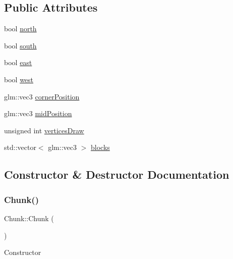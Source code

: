 \subsection*{Public Attributes}
\begin{DoxyCompactItemize}
\item 
bool \mbox{\hyperlink{class_chunk_aa24df445d45326890e2791dc53fd80cf}{north}}
\item 
bool \mbox{\hyperlink{class_chunk_a8bae9281635bcb398291a786190f0585}{south}}
\item 
bool \mbox{\hyperlink{class_chunk_a90a674c92aa8322aecb44740fde9ba62}{east}}
\item 
bool \mbox{\hyperlink{class_chunk_a5b1b0c6494b0aacd9380d7a81dab031b}{west}}
\item 
glm\+::vec3 \mbox{\hyperlink{class_chunk_addf7c4a1791aa402e16df9bf3ddd80ce}{corner\+Position}}
\item 
glm\+::vec3 \mbox{\hyperlink{class_chunk_a33e4237a6601ec4b8c8ced805633f55b}{mid\+Position}}
\item 
unsigned int \mbox{\hyperlink{class_chunk_a35a60418ea8637ec1fa73bec2627d927}{vertices\+Draw}}
\item 
std\+::vector$<$ glm\+::vec3 $>$ \mbox{\hyperlink{class_chunk_a82c2f083263b7f764ca5682a2e676ad7}{blocks}}
\end{DoxyCompactItemize}


\subsection{Constructor \& Destructor Documentation}
\mbox{\label{class_chunk_acc32e1562cad6664c98ee07edecdbdf9}} 
\subsubsection{\texorpdfstring{Chunk()}{Chunk()}\hspace{0.1cm}{\footnotesize\ttfamily [1/2]}}
{\footnotesize\ttfamily Chunk\+::\+Chunk (\begin{DoxyParamCaption}{ }\end{DoxyParamCaption})}



Constructor 

\mbox{\label{class_chunk_a39e0ddfaeaee152e9e591499590181b0}} 

